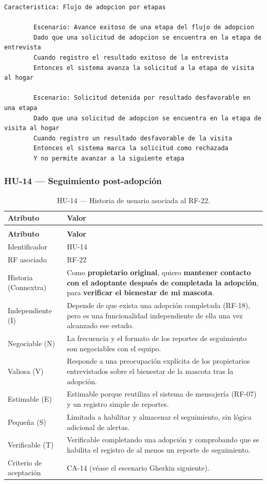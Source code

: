 \documentclass[journal,onecolumn]{IEEEtran}
\makeatletter
\newenvironment{atributos}[2]{%
	\small
	\begin{longtable}{@{}>{\raggedright\arraybackslash}p{4.2cm} >{\raggedright\arraybackslash}p{11.2cm}@{}}
		\caption{#2}\label{tab:#1}\\
		\toprule
		\textbf{Atributo} & \textbf{Valor} \\
		\midrule
		\endfirsthead
		\multicolumn{2}{@{}l}{\small\itshape (continuación)}\\
		\toprule
		\textbf{Atributo} & \textbf{Valor} \\
		\midrule
		\endhead
		\bottomrule
		\endlastfoot
	}{%
	\end{longtable}
	\normalsize
}
\makeatother
\begin{document}
	\begin{lstlisting}[style=gherkin,caption={CA-13 --- Escenario de aceptación de la historia HU-13.},label={lst:ca13}]
		Caracteristica: Flujo de adopcion por etapas
		
		Escenario: Avance exitoso de una etapa del flujo de adopcion
		Dado que una solicitud de adopcion se encuentra en la etapa de entrevista
		Cuando registro el resultado exitoso de la entrevista
		Entonces el sistema avanza la solicitud a la etapa de visita al hogar
		
		Escenario: Solicitud detenida por resultado desfavorable en una etapa
		Dado que una solicitud de adopcion se encuentra en la etapa de visita al hogar
		Cuando registro un resultado desfavorable de la visita
		Entonces el sistema marca la solicitud como rechazada
		Y no permite avanzar a la siguiente etapa
	\end{lstlisting}
	
	\subsubsection{HU-14 --- Seguimiento post-adopción}
	
	\begin{atributos}{HU-14}{HU-14 --- Historia de usuario asociada al RF-22.}
		Identificador & HU-14 \\
		RF asociado & RF-22 \\
		Historia (Connextra) & Como \textbf{propietario original}, quiero \textbf{mantener contacto con el adoptante después de completada la adopción}, para \textbf{verificar el bienestar de mi mascota}. \\
		Independiente (I) & Depende de que exista una adopción completada (RF-18), pero es una funcionalidad independiente de ella una vez alcanzado ese estado. \\
		Negociable (N) & La frecuencia y el formato de los reportes de seguimiento son negociables con el equipo. \\
		Valiosa (V) & Responde a una preocupación explícita de los propietarios entrevistados sobre el bienestar de la mascota tras la adopción. \\
		Estimable (E) & Estimable porque reutiliza el sistema de mensajería (RF-07) y un registro simple de reportes. \\
		Pequeña (S) & Limitada a habilitar y almacenar el seguimiento, sin lógica adicional de alertas. \\
		Verificable (T) & Verificable completando una adopción y comprobando que se habilita el registro de al menos un reporte de seguimiento. \\
		Criterio de aceptación & CA-14 (véase el escenario Gherkin siguiente). \\
	\end{atributos}
	
\end{document}
